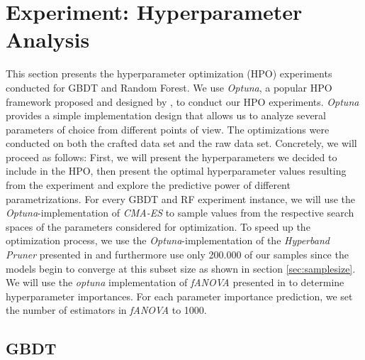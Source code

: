\section{Experiment: Hyperparameter Analysis}\label{sec:hpo}
This section presents the hyperparameter optimization (HPO) experiments conducted for GBDT and Random Forest. 
We use \textit{Optuna}, a popular HPO framework proposed and designed by \cite{akiba2019optuna}, to conduct our HPO experiments. 
\textit{Optuna} provides a simple implementation design that allows us to analyze several parameters of choice from different points of view. 
The optimizations were conducted on both the crafted data set and the raw data set. 
Concretely, we will proceed as follows: First, we will present the hyperparameters we decided to include in the HPO, then present the optimal hyperparameter values resulting from the experiment and explore the predictive power of different parametrizations. 
For every GBDT and RF experiment instance, we will use the \textit{Optuna}-implementation of \textit{CMA-ES} to sample values from the respective search spaces of the parameters considered for optimization. To speed up the optimization process, we use the \textit{Optuna}-implementation of the \textit{Hyperband Pruner} presented in \cite{li2018hyperband} and furthermore use only 200.000 of our samples since the models begin to converge at this subset size as shown in section \ref{sec:samplesize}. 
We will use the \textit{optuna} implementation of \textit{fANOVA} presented in \cite{fANOVA} to determine hyperparameter importances. 
For each parameter importance prediction, we set the number of estimators in \textit{fANOVA} to 1000.
\subsection{GBDT}

